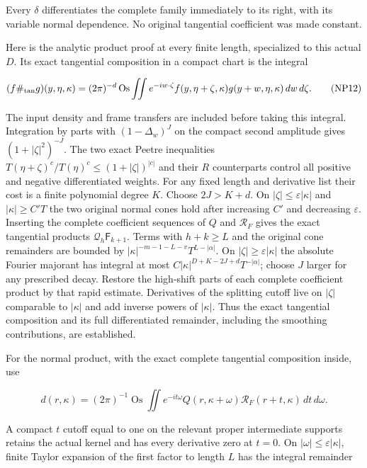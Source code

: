\documentclass[
  11pt,
]{article}
\begin{document}
Every \(\delta \) differentiates the complete family immediately to its
right, with its variable normal dependence. No original tangential
coefficient was made constant.

Here is the analytic product proof at every finite length, specialized
to this actual \(D\). Its exact tangential composition in a compact
chart is the integral

\[
 (f\#_{\rm tan}g)(y,\eta,\kappa)
 =(2\pi)^{-d}\operatorname{Os}\iint
    e^{-iw\cdot\zeta}f(y,\eta+\zeta,\kappa)g(y+w,\eta,\kappa)
    \,dw\,d\zeta.
 \tag{NP12}
\]

The input density and frame transfers are included before taking this
integral. Integration by parts with \((1-\Delta _w)^J\) on the compact
second amplitude gives \((1+|\zeta |^2)^{-J}\). The two exact Peetre
inequalities \(T(\eta +\zeta )^c/T(\eta )^c\le (1+|\zeta |)^{|c|}\) and
their \(R\) counterparts control all positive and negative
differentiated weights. For any fixed length and derivative list their
cost is a finite polynomial degree \(K\). Choose \(2J>K+d\). On
\(|\zeta |\le \varepsilon |\kappa |\) and \(|\kappa |\ge C'T\) the two
original normal cones hold after increasing \(C'\) and decreasing
\(\varepsilon \). Inserting the complete coefficient sequences of \(Q\)
and \(\mathcal R _F\) gives the exact tangential products
\(\mathcal Q _h\mathsf F _{k+1}\). Terms with \(h+k\ge L\) and the
original cone remainders are bounded by
\(|\kappa |^{-m-1-L-v}T^{L-|\alpha |}\). On
\(|\zeta |\ge \varepsilon |\kappa |\) the absolute Fourier majorant has
integral at most \(C|\kappa |^{D+K-2J+d}T^{-|\alpha |}\); choose \(J\)
larger for any prescribed decay. Restore the high-shift parts of each
complete coefficient product by that rapid estimate. Derivatives of the
splitting cutoff live on \(|\zeta|\) comparable to \(|\kappa |\) and add
inverse powers of \(|\kappa |\). Thus the exact tangential composition
and its full differentiated remainder, including the smoothing
contributions, are established.

For the normal product, with the exact complete tangential composition
inside, use

\[
 d(r,\kappa)
 =(2\pi)^{-1}\operatorname{Os}\iint
     e^{-it\omega}Q(r,\kappa+\omega)\mathcal R_F(r+t,\kappa)
     \,dt\,d\omega.
 \tag{NP13}
\]

A compact \(t\) cutoff equal to one on the relevant proper intermediate
supports retains the actual kernel and has every derivative zero at
\(t=0\). On \(|\omega |\le \varepsilon |\kappa |\), finite Taylor
expansion of the first factor to length \(L\) has the integral remainder
\end{document}
